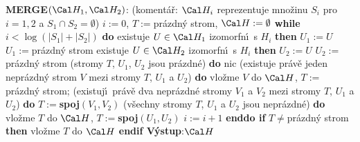 {\bf MERGE$(\Cal H_1,\Cal H_2)$}:\newline 
(koment\'a\v r: $\Cal H_i$ reprezentuje mno\v zinu $S_i$ pro $i=1
,2$ a $S_1\cap S_2=\emptyset$)\newline 
$i:=0$, $T:=$pr\'azdn\'y strom, $\Cal H:=\emptyset$\newline 
{\bf while} $i<\log(|S_1|+|S_2|)$ {\bf do}\newline 
\phantom{---}{\bf if} existuje $U\in \Cal H_1$ izomorfn\'\i\ s $H_i$ {\bf then}\newline 
\phantom{------}$U_1:=U$\newline 
\phantom{---}{\bf else}\newline
\phantom{------}$U_1:=$pr\'azdn\'y strom\newline 
\phantom{---}{\bf endif}\newline 
\phantom{---}{\bf if} existuje $U\in \Cal H_2$ izomorfn\'\i\ s $H_i$ {\bf then}\newline 
\phantom{------}$U_2:=U$\newline 
\phantom{---}{\bf else}\newline 
\phantom{------}$U_2:=$pr\'azdn\'y strom\newline 
\phantom{---}{\bf endif}\newline 
\phantom{---}{\bf case}\newline
\phantom{------}(stromy $T$, $U_1$, $U_2$ jsou pr\'azdn\'e) {\bf do}\newline 
\phantom{------}nic\newline 
\phantom{------}(existuje pr\'av\v e jeden nepr\'azdn\'y strom $V$ mezi stromy $T$, $U_1$ a $U_2$) {\bf do}\newline 
\phantom{------}vlo\v zme $V$ do $\Cal H$, $T:=$pr\'azdn\'y strom;\newline 
\phantom{------}(existuj\'\i\ pr\'av\v e dva nepr\'azdn\'e stromy $V_1$ a $V_2$ mezi stromy $T$, $U_1$ a $U_2$) {\bf do}\newline 
\phantom{------}$T:=${\bf spoj$(V_1,V_2)$}\newline 
\phantom{------}(v\v sechny stromy $T$, $U_1$ a $U_2$ jsou nepr\'azdn\'e)
{\bf do}\newline 
\phantom{------}vlo\v zme $T$ do $\Cal H$, $T:=${\bf spoj$(U_1,U_2)$}\newline 
\phantom{---}{\bf endcase}\newline
\phantom{---}$i:=i+1$\newline 
{\bf enddo\newline 
if} $T\ne$pr\'azdn\'y strom {\bf then} vlo\v zme $T$ do $\Cal H$ {\bf endif\newline 
V\'ystup}:$\Cal H$
\bigskip

